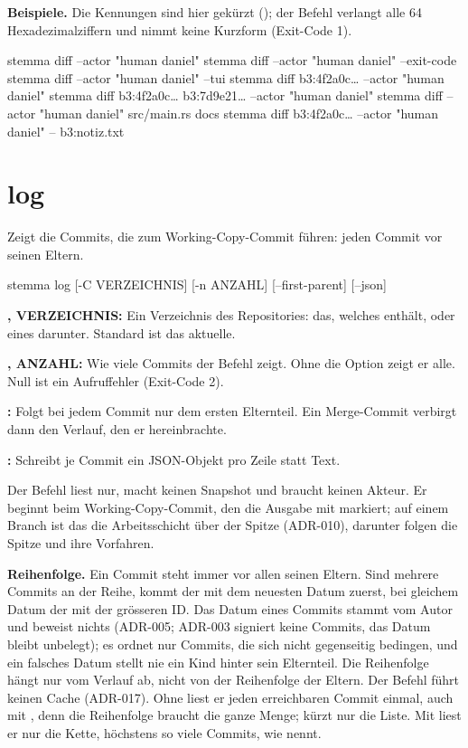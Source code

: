 {\bf Beispiele.} Die Kennungen sind hier gekürzt (); der Befehl verlangt
alle 64 Hexadezimalziffern und nimmt keine Kurzform (Exit-Code 1).

\starttyping
stemma diff --actor "human daniel"
stemma diff --actor "human daniel" --exit-code
stemma diff --actor "human daniel" --tui
stemma diff b3:4f2a0c… --actor "human daniel"
stemma diff b3:4f2a0c… b3:7d9e21… --actor "human daniel"
stemma diff --actor "human daniel" src/main.rs docs
stemma diff b3:4f2a0c… --actor "human daniel" -- b3:notiz.txt
\stoptyping

\section{log}

Zeigt die Commits, die zum Working-Copy-Commit führen: jeden Commit vor seinen Eltern.

\starttyping
stemma log [-C VERZEICHNIS] [-n ANZAHL] [--first-parent] [--json]
\stoptyping

\startitemize
\item {\bf {},  VERZEICHNIS:} Ein Verzeichnis des Repositories:
das, welches  enthält, oder eines darunter. Standard ist das aktuelle.
\item {\bf {},  ANZAHL:} Wie viele Commits der Befehl zeigt.
Ohne die Option zeigt er alle. Null ist ein Aufruffehler (Exit-Code 2).
\item {\bf {}:} Folgt bei jedem Commit nur dem ersten Elternteil.
Ein Merge-Commit verbirgt dann den Verlauf, den er hereinbrachte.
\item {\bf {}:} Schreibt je Commit ein JSON-Objekt pro Zeile statt Text.
\stopitemize

Der Befehl liest nur, macht keinen Snapshot und braucht keinen Akteur.
Er beginnt beim Working-Copy-Commit, den die Ausgabe mit  markiert;
auf einem Branch ist das die Arbeitsschicht über der Spitze (ADR-010),
darunter folgen die Spitze und ihre Vorfahren.

{\bf Reihenfolge.} Ein Commit steht immer vor allen seinen Eltern.
Sind mehrere Commits an der Reihe, kommt der mit dem neuesten Datum zuerst,
bei gleichem Datum der mit der grösseren ID.
Das Datum eines Commits stammt vom Autor und beweist nichts (ADR-005;
ADR-003 signiert keine Commits, das Datum bleibt unbelegt);
es ordnet nur Commits, die sich nicht gegenseitig bedingen, und ein falsches Datum
stellt nie ein Kind hinter sein Elternteil.
Die Reihenfolge hängt nur vom Verlauf ab, nicht von der Reihenfolge der Eltern.
Der Befehl führt keinen Cache (ADR-017). Ohne  liest er jeden erreichbaren
Commit einmal, auch mit , denn die Reihenfolge braucht die ganze Menge;
 kürzt nur die Liste. Mit  liest er nur die Kette,
höchstens so viele Commits, wie  nennt.

